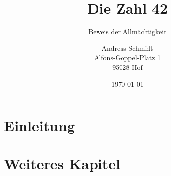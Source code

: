 \documentclass[a4paper,final]{hofuniversity}
\title{Die Zahl 42}
\subtitle{Beweis der Allmächtigkeit}
\author{
    Andreas Schmidt\\
    Alfons-Goppel-Platz 1\\
    95028 Hof
}
\date{\today}
\begin{document}

\makehead{}



\section{Einleitung}

\section{Weiteres Kapitel}

\printbibliography
\end{document}
